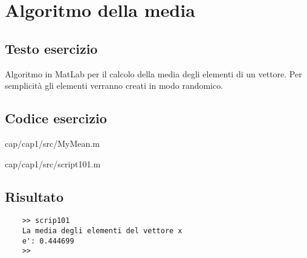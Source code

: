 \section{Algoritmo della media}

\subsection{Testo esercizio}
Algoritmo in MatLab per il calcolo della media degli elementi di un vettore. 
Per semplicità gli elementi verranno creati in modo randomico.

\subsection{Codice esercizio}

{cap/cap1/src/MyMean.m}


{cap/cap1/src/script101.m}

\subsection{Risultato}
\begin{verbatim}
    >> scrip101
    La media degli elementi del vettore x
    e': 0.444699
    >> 
\end{verbatim}